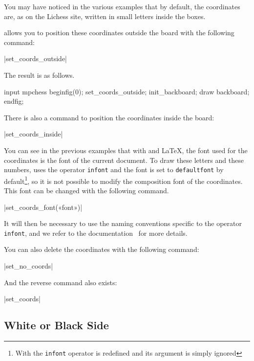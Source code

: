 \documentclass[english]{ltxdoc}
\begin{document}
You may have noticed in the various examples that by default, the coordinates are, as on the Lichess site, written in small letters inside the boxes.

\mpchess allows you to position these coordinates outside the board with the
following command:

\commande|set_coords_outside|\smallskip

The result is as follows.



\begin{ExempleMP}
input mpchess
beginfig(0);
set_coords_outside;
init_backboard;
draw backboard;
endfig;
\end{ExempleMP}

There is also a command to position the coordinates inside the board:

\commande|set_coords_inside|\smallskip

You can see in the previous examples that with  and
\LaTeX, the font used for the coordinates is the font of the current document. To draw these letters and
these numbers, \mpchess uses the \MP{} operator  \lstinline+infont+ and the font
is set to \lstinline+defaultfont+ by default\footnote{With 
the \lstinline+infont+ operator is redefined and its argument is simply
ignored}, so it is not possible to modify the composition font of the
coordinates. This font can be changed with the following command.

\commande|set_coords_font(«font»)|\smallskip

It will then be necessary to use the naming conventions specific to the \MP{}
operator
\lstinline+infont+, and we refer to the
\MP documentation~\cite{ctan-metapost} for more details.

You can also delete the coordinates with the following command:

\commande|set_no_coords|\smallskip

And the reverse command also exists:

\commande|set_coords|\smallskip


\subsection{White or Black Side}
\end{document}
